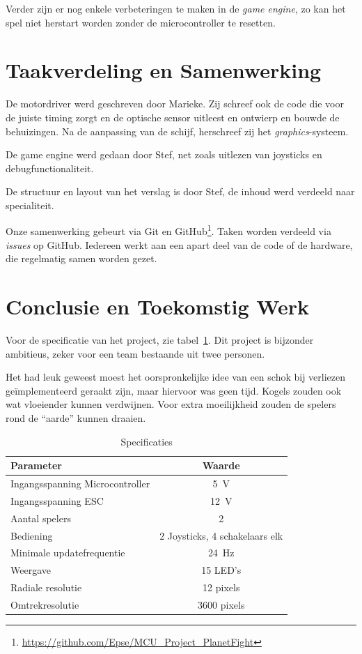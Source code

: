 \documentclass[12pt]{ugentreport}
\begin{document}
Verder zijn er nog enkele verbeteringen te maken in de \emph{game engine},
zo kan het spel niet herstart worden zonder de microcontroller te resetten.

\section{Taakverdeling en Samenwerking}
De motordriver werd geschreven door Marieke. Zij schreef ook de code die voor de
juiste timing zorgt en de optische sensor uitleest en ontwierp en bouwde de
behuizingen. Na de aanpassing van de schijf, herschreef zij het \emph{graphics}-systeem.

De game engine werd gedaan door Stef,
net zoals uitlezen van joysticks en debugfunctionaliteit.

De structuur en layout van het verslag is door Stef, de inhoud werd verdeeld
naar specialiteit.

Onze samenwerking gebeurt via Git en
GitHub\footnote{\url{https://github.com/Epse/MCU_Project_PlanetFight}}. Taken worden
verdeeld via \emph{issues} op GitHub. Iedereen werkt aan een apart deel van de
code of de hardware, die regelmatig samen worden gezet.

\section{Conclusie en Toekomstig Werk}
Voor de specificatie van het project, zie tabel~\ref{tbl:specs}.
Dit project is bijzonder ambitieus, zeker voor een team bestaande uit twee
personen.

Het had leuk geweest moest het oorspronkelijke idee van een schok bij verliezen
geïmplementeerd geraakt zijn, maar hiervoor was geen tijd. Kogels zouden ook wat
vloeiender kunnen verdwijnen. Voor extra moeilijkheid zouden de spelers rond  de
``aarde'' kunnen draaien.

\begin{table}
  \centering
  \begin{tabular}{l|c}
    \hline
    Parameter & Waarde\\
    \hline
    Ingangsspanning Microcontroller & \SI{5}{\volt}\\
    Ingangsspanning ESC & \SI{12}{\volt}\\
    Aantal spelers & 2\\
    Bediening & 2 Joysticks, 4 schakelaars elk\\
    Minimale updatefrequentie & \SI{24}{\hertz}\\
    Weergave & 15 LED's\\
    Radiale resolutie & 12 pixels\\
    Omtrekresolutie & 3600 pixels\\
    \hline
  \end{tabular}
  \caption{Specificaties}
  \label{tbl:specs}
\end{table}
\end{document}
